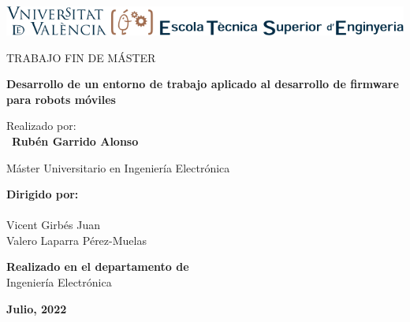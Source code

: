 \begin{center}

\vspace*{1cm}

\includegraphics[width=\textwidth]{fig/ETSE.png}

\vspace*{3cm}
\begin{large}
TRABAJO FIN DE MÁSTER
\end{large}

\vspace*{0.1in}
\textbf{\huge Desarrollo de un entorno de trabajo aplicado al desarrollo de firmware para robots móviles} %

\vspace*{.2in}

{\large Realizado por:}\\
\vspace*{0.2cm}\
\textbf{\Large Rubén Garrido Alonso} %

\vspace*{2cm}

{\LARGE Máster Universitario en Ingeniería Electrónica} %

\vspace*{0.2in}
\textbf{Dirigido por:}\\\
\vspace*{0.2cm}\\
{\large Vicent Girbés Juan}\\ %
{\large Valero Laparra Pérez-Muelas}\\

\vspace*{0.2in}

\textbf{Realizado en el departamento de}\\
{\large Ingeniería Electrónica}

\vspace*{.6in}
\textbf{\Large Julio, 2022} %

\end{center}


\pagenumbering{roman} %
